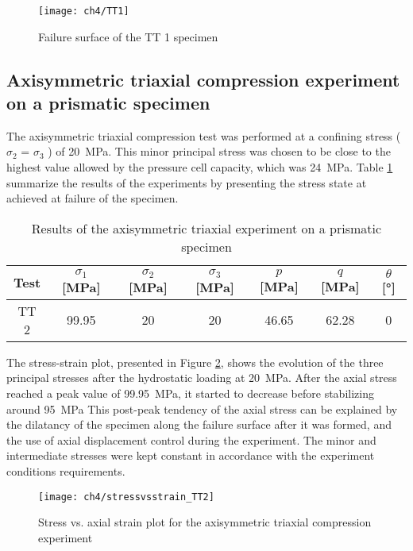 \begin{figure}[tb]
    \centering
    \texttt{[image: ch4/TT1]}
    \captionsetup{justification=centering}
    \caption{Failure surface of the TT 1 specimen}
    \label{fig4:12}
\end{figure} 

\subsection{Axisymmetric triaxial compression experiment on a prismatic specimen}

The axisymmetric triaxial compression test was performed at a confining stress ($\sigma_2$ = $\sigma_3$ ) of \SI{20}{MPa}. This minor principal stress was chosen to be close to the highest value allowed by the pressure cell capacity, which was \SI{24}{MPa}. Table \ref{tb4:TT2} summarize the results of the experiments by presenting the stress state at achieved at failure of the specimen. 

\begin{table}
    \centering
    \captionsetup{justification=centering}
    \caption{Results of the axisymmetric triaxial experiment on a prismatic specimen}
    \begin{tabular}{ccccccc}
        \hline
        Test & $\sigma_1$ [\si{MPa}] & $\sigma_2$ [\si{MPa}] & $\sigma_3$ [\si{MPa}] & $p$ [\si{MPa}] & $q$ [\si{MPa}] & $\theta$ [\si{\degree}] \\
        \hline
        \hline
        TT 2 & 99.95 & 20 & 20 & 46.65 & 62.28 & 0\\
        \hline
    \end{tabular}
    \label{tb4:TT2}
\end{table}

The stress-strain plot, presented in Figure \ref{fig4:13}, shows the evolution of the three principal stresses after the hydrostatic loading at \SI{20}{MPa}. After the axial stress reached a peak value of \SI{99.95}{MPa}, it started to decrease before stabilizing around \SI{95}{MPa} This post-peak tendency of the axial stress can be explained by the dilatancy of the specimen along the failure surface after it was formed, and the use of axial displacement control during the experiment. The minor and intermediate stresses were kept constant in accordance with the experiment conditions requirements.

\begin{figure}[tb]
    \centering
    \texttt{[image: ch4/stressvsstrain\_TT2]}
    \captionsetup{justification=centering}
    \caption{Stress vs. axial strain plot for the axisymmetric triaxial compression experiment}
    \label{fig4:13}
\end{figure} 

